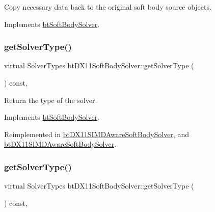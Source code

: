 Copy necessary data back to the original soft body source objects. 

Implements \hyperlink{classbtSoftBodySolver_ac4034ba178cb75bd880a44958eaa38d1}{bt\+Soft\+Body\+Solver}.

\mbox{\label{classbtDX11SoftBodySolver_a1142bb4f735d275f161f003f7d703768}} 
\subsubsection{\texorpdfstring{get\+Solver\+Type()}{getSolverType()}\hspace{0.1cm}{\footnotesize\ttfamily [1/2]}}
{\footnotesize\ttfamily virtual Solver\+Types bt\+D\+X11\+Soft\+Body\+Solver\+::get\+Solver\+Type (\begin{DoxyParamCaption}{ }\end{DoxyParamCaption}) const\hspace{0.3cm}{\ttfamily [inline]}, {\ttfamily [virtual]}}

Return the type of the solver. 

Implements \hyperlink{classbtSoftBodySolver_aa08308ddb8e4661ab3c3e23cf3da647c}{bt\+Soft\+Body\+Solver}.



Reimplemented in \hyperlink{classbtDX11SIMDAwareSoftBodySolver_ad36369c7c58e1cb8ddea7ebd54612eb9}{bt\+D\+X11\+S\+I\+M\+D\+Aware\+Soft\+Body\+Solver}, and \hyperlink{classbtDX11SIMDAwareSoftBodySolver_ad36369c7c58e1cb8ddea7ebd54612eb9}{bt\+D\+X11\+S\+I\+M\+D\+Aware\+Soft\+Body\+Solver}.

\mbox{\label{classbtDX11SoftBodySolver_a1142bb4f735d275f161f003f7d703768}} 
\subsubsection{\texorpdfstring{get\+Solver\+Type()}{getSolverType()}\hspace{0.1cm}{\footnotesize\ttfamily [2/2]}}
{\footnotesize\ttfamily virtual Solver\+Types bt\+D\+X11\+Soft\+Body\+Solver\+::get\+Solver\+Type (\begin{DoxyParamCaption}{ }\end{DoxyParamCaption}) const\hspace{0.3cm}{\ttfamily [inline]}, {\ttfamily [virtual]}}


